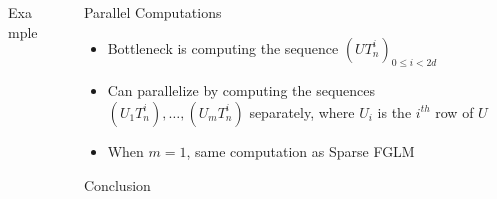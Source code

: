 \documentclass[final]{beamer}
\newlength{\sepwid}
\newlength{\onecolwid}
\newlength{\twocolwid}
\begin{document}
\begin{frame}[t]
\begin{columns}[t]
\begin{column}{\twocolwid}
\begin{block}{Example}
\end{block}


\end{column} %

\begin{column}{\sepwid}\end{column} %

\begin{column}{\onecolwid} %

\begin{alertblock}{Parallel Computations}
	\begin{itemize}
		\item Bottleneck is computing the sequence $(UT_n^i)_{0 \le i < 2d}$
		\item Can parallelize by computing the sequences $(U_1T_n^i),\dots,(U_mT_n^i)$
		separately, where $U_i$ is the $i^{th}$ row of $U$
		\item When $m=1$, same computation as Sparse FGLM
	\end{itemize}
\end{alertblock}


\begin{block}{Conclusion}

\end{block}






\end{column}
\end{columns}
\end{frame}
\end{document}
